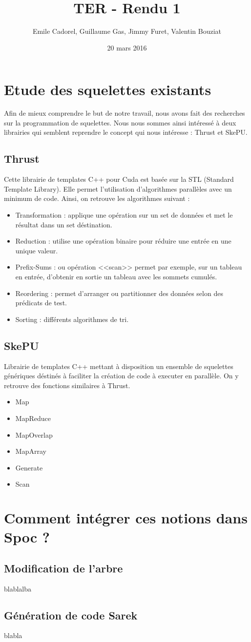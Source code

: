 \documentclass{report}
\title{TER - Rendu 1}
\author{Emile Cadorel, Guillaume Gas, Jimmy Furet, Valentin Bouziat}
\date{20 mars 2016}
\begin{document}
\maketitle

\chapter{Etude des squelettes existants}
Afin de mieux comprendre le but de notre travail, nous avons fait des recherches sur la programmation de squelettes. Nous nous sommes ainsi intéressé à deux librairies qui semblent reprendre le concept qui nous intéresse : Thrust et SkePU.
\section{Thrust}
Cette librairie de templates C++ pour Cuda est basée sur la STL (Standard Template Library). Elle permet l'utilisation d'algorithmes parallèles avec un minimum de code. Ainsi, on retrouve les algorithmes suivant :

\begin{itemize}

\item Transformation : applique une opération sur un set de données et met le résultat dans un set déstination.
\item Reduction : utilise une opération binaire pour réduire une entrée en une unique valeur.
\item Prefix-Sums : ou opération <<scan>> permet par exemple, sur un tableau en entrée, d'obtenir en sortie un tableau avec les sommets cumulés.
\item Reordering : permet d'arranger ou partitionner des données selon des prédicats de test.
\item Sorting : différents algorithmes de tri.

\end{itemize}

\section{SkePU}
Librairie de templates C++ mettant à disposition un ensemble de squelettes génériques déstinés à faciliter la création de code à executer en parallèle. On y retrouve des fonctions similaires à Thrust.

\begin{itemize}

\item Map
\item MapReduce
\item MapOverlap
\item MapArray
\item Generate
\item Scan

\end{itemize}

\chapter{Comment intégrer ces notions dans Spoc ?}
\section{Modification de l'arbre}
blablalba

\section{Génération de code Sarek}
blabla
\end{document}
